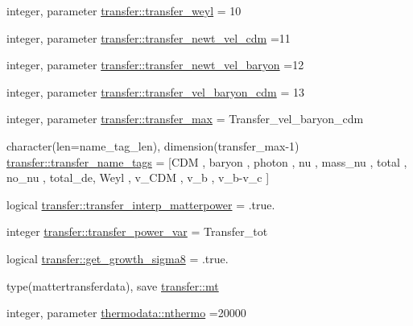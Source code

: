 \begin{DoxyCompactItemize}
\item 
integer, parameter \mbox{\hyperlink{namespacetransfer_adc4f1fee4e89ed92a0865f3854118eca}{transfer\+::transfer\+\_\+weyl}} = 10
\item 
integer, parameter \mbox{\hyperlink{namespacetransfer_acac3c3e5a8b36cd08ca97ca40bd92fcc}{transfer\+::transfer\+\_\+newt\+\_\+vel\+\_\+cdm}} =11
\item 
integer, parameter \mbox{\hyperlink{namespacetransfer_acfa190894a4b625fe771219f23b9bc2f}{transfer\+::transfer\+\_\+newt\+\_\+vel\+\_\+baryon}} =12
\item 
integer, parameter \mbox{\hyperlink{namespacetransfer_a355c8bcd1bf73a87d603cd7f77c702d0}{transfer\+::transfer\+\_\+vel\+\_\+baryon\+\_\+cdm}} = 13
\item 
integer, parameter \mbox{\hyperlink{namespacetransfer_ac87f6542d01968f20465ccd32f02667c}{transfer\+::transfer\+\_\+max}} = Transfer\+\_\+vel\+\_\+baryon\+\_\+cdm
\item 
character(len=name\+\_\+tag\+\_\+len), dimension(transfer\+\_\+max-\/1) \mbox{\hyperlink{namespacetransfer_ac02a42ae84b0dbee0b48ed2dd95b6dc8}{transfer\+::transfer\+\_\+name\+\_\+tags}} = \mbox{[}\textquotesingle{}C\+DM \textquotesingle{}, \textquotesingle{}baryon \textquotesingle{}, \textquotesingle{}photon \textquotesingle{}, \textquotesingle{}nu \textquotesingle{}, \textquotesingle{}mass\+\_\+nu \textquotesingle{}, \textquotesingle{}total \textquotesingle{}, \textquotesingle{}no\+\_\+nu \textquotesingle{}, \textquotesingle{}total\+\_\+de\textquotesingle{}, \textquotesingle{}Weyl \textquotesingle{}, \textquotesingle{}v\+\_\+\+C\+DM \textquotesingle{}, \textquotesingle{}v\+\_\+b \textquotesingle{}, \textquotesingle{}v\+\_\+b-\/v\+\_\+c \textquotesingle{}\mbox{]}
\item 
logical \mbox{\hyperlink{namespacetransfer_a1dfb4e8c94804bd740e5d676a5b23d6f}{transfer\+::transfer\+\_\+interp\+\_\+matterpower}} = .true.
\item 
integer \mbox{\hyperlink{namespacetransfer_abd233741f7f81807122709afee55d2f2}{transfer\+::transfer\+\_\+power\+\_\+var}} = Transfer\+\_\+tot
\item 
logical \mbox{\hyperlink{namespacetransfer_a271d66692c1d4b207c6e033b5a8197e8}{transfer\+::get\+\_\+growth\+\_\+sigma8}} = .true.
\item 
type(mattertransferdata), save \mbox{\hyperlink{namespacetransfer_abf8737afeb10e8b167c70416ad103a74}{transfer\+::mt}}
\item 
integer, parameter \mbox{\hyperlink{namespacethermodata_ab5a6325bede2b0cce4e867e9e1e18215}{thermodata\+::nthermo}} =20000

\end{DoxyCompactItemize}
